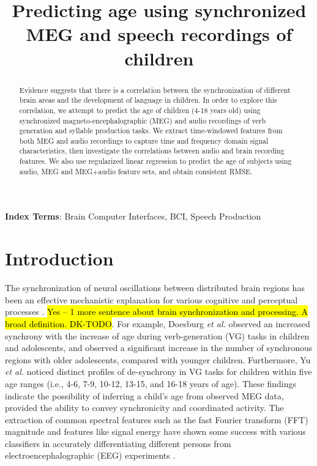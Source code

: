 \documentclass[a4paper]{article}
\title{Predicting age using synchronized MEG and speech recordings of children}
\newcommand{\FR}[1]{{\small \textcolor{red}{\hl{#1}}}}
\begin{document}
\maketitle
% 
\begin{abstract}
Evidence suggests that there is a correlation between the synchronization of different brain areas and the development of language in children. In order to explore this correlation, we attempt to predict the age of children (4-18 years old) using synchronized magneto-encephalographic (MEG) and audio recordings of verb generation and syllable production tasks. We extract time-windowed features from both MEG and audio recordings to capture time and frequency domain signal characteristics, then investigate the correlations between audio and brain recording features. We also use regularized linear regression to predict the age of subjects using audio, MEG and MEG+audio feature sets, and obtain consistent RMSE.
\end{abstract}


\noindent\textbf{Index Terms}: Brain Computer Interfaces, BCI, Speech Production

\section{Introduction}

The synchronization of neural oscillations between distributed brain regions has been an effective mechanistic explanation for various cognitive and perceptual processes \cite{Fries2015,Nakasaki1989,NeuralSync}. \FR{Yes -- 1 more sentence about brain synchronization and processing. A broad definition. DK-TODO}. For example, Doesburg {\em et al.} \cite{Doesburg2016} observed an increased synchrony with the increase of age during verb-generation (VG) tasks in children and adolescents, and observed a significant increase in the number of synchronous regions with older adolescents, compared with younger children. Furthermore, Yu {\em et al.} \cite{Yu2014} noticed distinct profiles of de-synchrony in VG tasks for children within five age ranges (i.e., 4-6, 7-9, 10-12, 13-15, and 16-18 years of age). These findings indicate the possibility of inferring a child's age from observed MEG data, provided the ability to convey synchronicity and coordinated activity. The extraction of common spectral features such as the fast Fourier transform (FFT) magnitude and features like signal energy have shown some success with various classifiers in accurately differentiating different persons from electroencephalographic (EEG) experiments \cite{Nguyen2012, Poulos2001}. 
\end{document}
